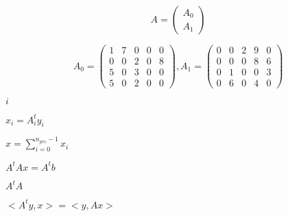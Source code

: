 \documentclass{article}
\begin{document}
\[ A = \left( \begin{array}{c} A_0 \\ A_1 \end{array} \right) \]
\pagebreak

\[ A_0 = \left( \begin{array}{ccccc} 1&7&0&0&0\\0&0&2&0&8\\5&0&3&0&0\\5&0&2&0&0\end{array} \right) , A_1 = \left( \begin{array}{ccccc} 0&0&2&9&0\\0&0&0&8&6\\0&1&0&0&3\\0&6&0&4&0\end{array} \right) \]
\pagebreak

$ i $
\pagebreak

$ x_i=A_i^t y_i$
\pagebreak

$ x = \sum_{i=0}^{n_{prc}-1} x_i $
\pagebreak

$ A^t A x = A^t b $
\pagebreak

$A^tA$
\pagebreak

$< A^t y, x > = < y , Ax > $
\pagebreak
\end{document}
